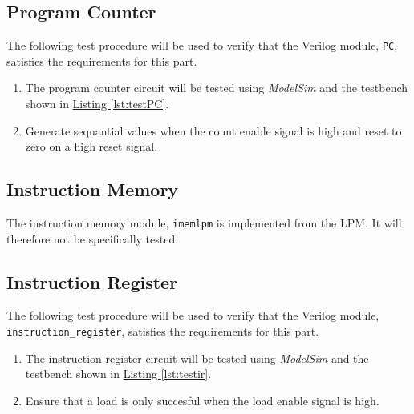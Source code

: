 
\subsection{Program Counter} %
\label{sub:program_counter_pro}

The following test procedure will be used to verify that the Verilog module, \verb|PC|, satisfies the requirements for this part.

\begin{enumerate}
    \item The program counter circuit will be tested using \emph{ModelSim} and the testbench shown in \hyperref[lst:testPC]{Listing \ref*{lst:testPC}}.
    \item Generate sequantial values when the count enable signal is high and reset to zero on a high reset signal.
\end{enumerate}


\subsection{Instruction Memory} %
\label{sub:instruction_memory}

The instruction memory module, \verb|imemlpm| is implemented from the LPM.
It will therefore not be specifically tested.


\subsection{Instruction Register} %
\label{sub:instruction_register_pro}

The following test procedure will be used to verify that the Verilog module, \verb|instruction_register|, satisfies the requirements for this part.

\begin{enumerate}
    \item The instruction register circuit will be tested using \emph{ModelSim} and the testbench shown in \hyperref[lst:testir]{Listing \ref*{lst:testir}}.
    \item Ensure that a load is only succesful when the load enable signal is high.
\end{enumerate}


